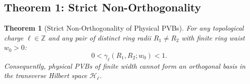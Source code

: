 \documentclass[11pt,a4paper]{article}
\newtheorem{theorem}{Theorem}
\begin{document}
\subsection{Theorem 1: Strict Non-Orthogonality}

\begin{theorem}[Strict Non-Orthogonality of Physical PVBs]
\label{thm:non_orthogonality}
For any topological charge $\ell \in \mathbb{Z}$ and any pair of distinct ring radii $R_1 \neq R_2$ with finite ring waist $w_0 > 0$:
\begin{equation}
0 < \gamma_\ell(R_1, R_2; w_0) < 1.
\label{eq:thm1_claim}
\end{equation}
Consequently, physical PVBs of finite width cannot form an orthogonal basis in the transverse Hilbert space $\mathcal{H}_\ell$.
\end{theorem}
\end{document}
